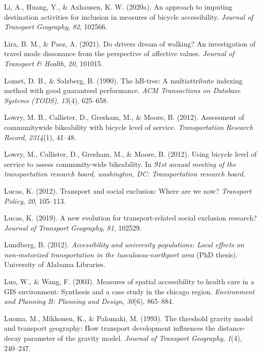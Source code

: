 \documentclass[
11pt, %
oneside, %
english, %
singlespacing, %
]{macthesis} %
\newlength{\cslhangindent}
\newenvironment{CSLReferences}[2] %
 {%
  \setlength{\parindent}{0pt}
  \ifodd #1 \everypar{\setlength{\hangindent}{\cslhangindent}}\ignorespaces\fi
  \ifnum #2 > 0
  \setlength{\parskip}{#2\baselineskip}
  \fi
 }%
 {}
\begin{document}
\begin{CSLReferences}{1}{0}
Li, A., Huang, Y., \& Axhausen, K. W. (2020a). An approach to imputing destination activities for inclusion in measures of bicycle accessibility. \emph{Journal of Transport Geography}, \emph{82}, 102566.

Lira, B. M., \& Paez, A. (2021). Do drivers dream of walking? An investigation of travel mode dissonance from the perspective of affective values. \emph{Journal of Transport \& Health}, \emph{20}, 101015.

Lomet, D. B., \& Salzberg, B. (1990). The hB-tree: A multiattribute indexing method with good guaranteed performance. \emph{ACM Transactions on Database Systems (TODS)}, \emph{15}(4), 625--658.

Lowry, M. B., Callister, D., Gresham, M., \& Moore, B. (2012). Assessment of communitywide bikeability with bicycle level of service. \emph{Transportation Research Record}, \emph{2314}(1), 41--48.

Lowry, M., Callister, D., Gresham, M., \& Moore, B. (2012). Using bicycle level of service to assess community-wide bikeability. In \emph{91st annual meeting of the transportation research board, washington, DC: Transportation research board}.

Lucas, K. (2012). Transport and social exclusion: Where are we now? \emph{Transport Policy}, \emph{20}, 105--113.

Lucas, K. (2019). A new evolution for transport-related social exclusion research? \emph{Journal of Transport Geography}, \emph{81}, 102529.

Lundberg, B. (2012). \emph{Accessibility and university populations: Local effects on non-motorized transportation in the tuscaloosa-northport area} (PhD thesis). University of Alabama Libraries.

Luo, W., \& Wang, F. (2003). Measures of spatial accessibility to health care in a GIS environment: Synthesis and a case study in the chicago region. \emph{Environment and Planning B: Planning and Design}, \emph{30}(6), 865--884.

Luoma, M., Mikkonen, K., \& Palomaki, M. (1993). The threshold gravity model and transport geography: How transport development influences the distance-decay parameter of the gravity model. \emph{Journal of Transport Geography}, \emph{1}(4), 240--247.


\end{CSLReferences}
\end{document}
